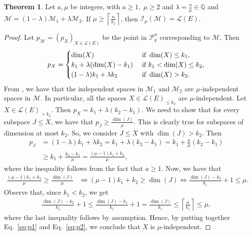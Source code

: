 \documentclass[a4paper,11pt,reqno]{amsart}
\theoremstyle{definition}
\newtheorem{theorem}{Theorem}[section]
\newcommand{\mM}{\mathcal{M}}
\newcommand{\mL}{\mathcal{L}}
\newcommand{\mI}{\mathcal{I}}
\newcommand{\RP}{\mathcal{P}_q^n}
\begin{document}
{\begin{theorem}\label{thm:mu-indep_uniform}
    Let $a,\mu$ be integers, with $a\geq 1, \; \mu\geq 2$ and $\lambda=\frac{a}{\mu}\in\mathbb{Q}$ and $\mM=(1-\lambda)\mM_1+\lambda\mM_2$. If $\mu\geq \left\lceil \frac{n}{k_1}\right\rceil$, then $\mI_\mu(\mM) = \mL(E)$.
\end{theorem}
\begin{proof}
     Let $p_\mM=(p_X)_{X\in\mL(E)}$ be the point in $\RP$ corresponding to $\mM$. Then 
    $$p_X = \begin{cases}
        \dim(X) & \textnormal{ if }\dim(X)\leq k_1,\\
        k_1+\lambda(\dim(X)-k_1)   & \textnormal{ if } k_1<\dim(X)\leq k_2,\\
        (1-\lambda)k_1 + \lambda k_2 & \textnormal{ if } \dim(X)>k_2.
    \end{cases}$$
    From , we have that the independent spaces in $\mM_1$ and $\mM_2$ are $\mu$-independent spaces in $\mM$. In particular, all the spaces $X\in\mL(E)_{\leq k_2}$ are $\mu$-independent. Let $X\in\mL(E)_{>k_2}$. Then $p_X = k_1+\lambda(k_2-k_1)$. We need to show that for every subspace $J\leq X$, we have that $p_J\geq \frac{\dim(J)}{\mu}$. This is clearly true for subspaces of dimension at most $k_2$. So, we consider $J\leq X$ with $\dim(J)> k_2$. Then 
    \begin{align*}
        p_J &= (1-\lambda)k_1 + \lambda k_2 = k_1 + \lambda(k_2-k_1) = k_1 + \frac{a}{\mu}(k_2-k_1) \\
        &\geq k_1 +\frac{k_2-k_1}{\mu} = \frac{(\mu-1)k_1+k_2}{\mu},
    \end{align*}
    where the inequality follows from the fact that $a\geq 1$. 
    Now, we have that 
    \begin{align}\label{eq:p1}
        \frac{(\mu-1)k_1+k_2}{\mu}\geq \frac{\dim(J)}{\mu} &\Leftrightarrow (\mu-1)k_1+k_2\geq \dim(J)\Leftrightarrow \frac{\dim(J)-k_2}{k_1} +1\leq \mu.
    \end{align}
    Observe that, since $k_1<k_2$, we get 
    \begin{align}\label{eq:p2}
        \frac{\dim(J)-k_2}{k_1} +1\leq \frac{\dim(J)-k_1}{k_1} +1 = \frac{\dim(J)}{k_1}\leq \left\lceil \frac{n}{k_1}\right\rceil \leq \mu,
    \end{align}
    where the last inequality follows by assumption. 
    Hence, by putting together Eq.~\eqref{eq:p1} and Eq.~\eqref{eq:p2}, we conclude that $X$ is $\mu$-independent. 
\end{proof}



}
\end{document}
